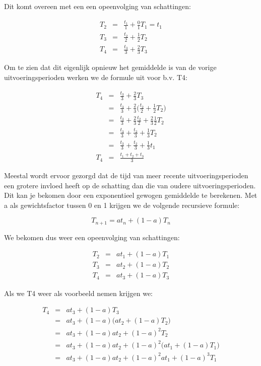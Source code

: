 Dit komt overeen met een een opeenvolging van
schattingen:

\begin{eqnarray*}
T_2 & = & \frac{t_1}{1} + \frac{0}{1}T_1 = t_1 \\
T_3 & = & \frac{t_2}{2} + \frac{1}{2}T_2       \\
T_4 & = & \frac{t_3}{3} + \frac{2}{3}T_3
\end{eqnarray*}

Om te zien dat dit eigenlijk opnieuw het gemiddelde is van de
vorige uitvoeringsperioden werken we de formule uit voor b.v.
T4:

\begin{eqnarray*}
T_4 & = & \frac{t_3}{3} + \frac{2}{3}T_3 \\
    & = & \frac{t_3}{3} + \frac{2}{3}\Bigg(\frac{t_2}{2} + \frac{1}{2}T_2\Bigg)
\\
    & = & \frac{t_3}{3} + \frac{2}{3}\frac{t_2}{2} + \frac{2}{3}\frac{1}{2}T_2
\\
    & = & \frac{t_3}{3} + \frac{t_2}{3} + \frac{1}{3}T_2 \\
    & = & \frac{t_3}{3} + \frac{t_2}{3} + \frac{1}{3}t_1 \\
T_4 & = & \frac{t_1 + t_2 + t_3}{3}
\end{eqnarray*}

Meestal wordt ervoor gezorgd dat de tijd van meer recente
uitvoeringsperioden een grotere invloed heeft op de schatting dan die
van oudere uitvoeringsperioden. Dit kan je bekomen door een
exponentieel gewogen gemiddelde te berekenen. Met a als gewichtsfactor
tussen 0 en 1 krijgen we de volgende recursieve formule:

\begin{displaymath}
T_{n+1} = at_n + (1-a)T_n
\end{displaymath}


We bekomen dus weer een opeenvolging van schattingen:

\begin{eqnarray*}
T_2 & = & at_1 + (1-a)T_1 \\
T_3 & = & at_2 + (1-a)T_2 \\
T_4 & = & at_3 + (1-a)T_3
\end{eqnarray*}

Als we T4 weer als voorbeeld nemen krijgen we:

\begin{eqnarray*}
T_4 & = & at_3 + (1-a)T_3 \\
    & = & at_3 + (1-a)\Big(at_2 + (1-a)T_2\Big) \\
    & = & at_3 + (1-a)at_2 + (1-a)^2T_2 \\
    & = & at_3 + (1-a)at_2 + (1-a)^2\Big(at_1 + (1-a)T_1\Big) \\
    & = & at_3 + (1-a)at_2 + (1-a)^2at_1 + (1-a)^3T_1
\end{eqnarray*}


